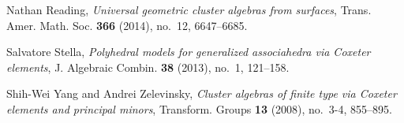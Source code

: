 \documentclass[11pt]{amsart}
\theoremstyle{definition}
\numberwithin{equation}{section}
\numberwithin{figure}{section}
\begin{document}
\begin{thebibliography}{CFZ02}
Nathan Reading, \emph{Universal geometric cluster algebras from surfaces},
  Trans. Amer. Math. Soc. \textbf{366} (2014), no.~12, 6647--6685. 

Salvatore Stella, \emph{Polyhedral models for generalized associahedra via
  {C}oxeter elements}, J. Algebraic Combin. \textbf{38} (2013), no.~1,
  121--158. 

Shih-Wei Yang and Andrei Zelevinsky, \emph{Cluster algebras of finite type via
  {C}oxeter elements and principal minors}, Transform. Groups \textbf{13}
  (2008), no.~3-4, 855--895. 

\end{thebibliography}
\end{document}
